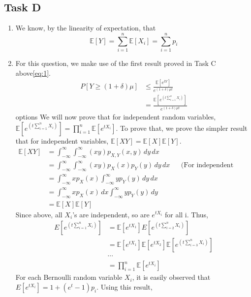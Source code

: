 \subsection{Task D}
\begin{enumerate}
    \item We know, by the linearity of expectation, that \[
        \mathbb{E}[Y]=\sum_{i=1}^{n}\mathbb{E}[X_i]=\sum_{i=1}^{n}p_i
    \]
    \item For this question, we make use of the first result proved in Task C above\ref{eq:1}. 
    \begin{align*}       
        \label{Hello}
        P[Y\ge (1+\delta)\mu]&\le \frac{\mathbb{E}[e^{tY}]}{e^{(1+\delta)\mu t}}\\
        &=\frac{\mathbb{E}[e^{\left(t \sum_{i=1}^n X_i\right)}]}{e^{(1+\delta)\mu t}}
    \end{align*}options
    We will now prove that for independent random variables, $\mathbb{E}[e^{\left(t\sum_{i=1}^n X_i\right)}]=\prod_{i=1}^n \mathbb{E}[e^{tX_i}]$. To prove that, we prove the simpler result that for independent variables, $\mathbb{E}[XY]=\mathbb{E}[X]\mathbb{E}[Y]$.
    \begin{align*}
        \mathbb{E}[XY]&=\int_{-\infty}^{\infty}\int_{-\infty}^{\infty}(xy)p_{X,Y}(x,y) \, dy \, dx\\
        & = \int_{-\infty}^{\infty}\int_{-\infty}^{\infty}(xy)p_X(x)p_Y(y) \, dy \, dx && \text{(For independent RVs, p(xy)=p(x)p(y))}\\
        &= \int_{-\infty}^{\infty}x p_X(x) \int_{-\infty}^{\infty}yp_Y(y) \, dy \, dx\\
        &= \int_{-\infty}^{\infty}x p_X(x) \, dx \int_{-\infty}^{\infty}y p_Y(y) \, dy\\
        &= \mathbb{E}[X]\mathbb{E}[Y]
    \end{align*}
    Since above, all $X_i$'s are independent, so are $e^{tX_i}$ for all i. Thus,
    \begin{align*}
        E[e^{\left(t \sum_{i=1}^n X_i\right)}]&=\mathbb{E}[e^{tX_1}]E[e^{\left(t \sum_{i=2}^n X_i\right)}]\\
        &=\mathbb{E}[e^{tX_1}]\mathbb{E}[e^{tX_2}]\mathbb{E}[e^{\left(t \sum_{i=3}^n X_i\right)}]\\
        &\cdots\\
        &=\prod_{i=1}^n \mathbb{E}[e^{tX_i}]
    \end{align*}
    For each Bernoulli random variable $X_i$, it is easily observed that $E[e^{tX_i}]=1+(e^t-1)p_i$. Using this result,

\end{enumerate}
